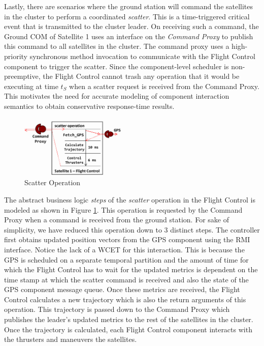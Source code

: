 Lastly, there are scenarios where the ground station will command the satellites in the cluster to perform a coordinated \emph{scatter}. This is a time-triggered critical event that is transmitted to the cluster leader. On receiving such a command, the Ground COM of Satellite 1 uses an interface on the \emph{Command Proxy} to publish this command to all satellites in the cluster. The command proxy uses a high-priority synchronous method invocation to communicate with the Flight Control component to trigger the scatter. Since the component-level scheduler is non-preemptive, the Flight Control cannot trash any operation that it would be executing at time $t_S$ when a scatter request is received from the Command Proxy. This motivates the need for accurate modeling of component interaction semantics to obtain conservative response-time results. 

\begin{figure}[htb]
	\centering
	\includegraphics[width=0.45\textwidth]{figs/scatter.jpg}
	\caption{Scatter Operation}
	\label{fig:FLC}
\end{figure}

The abstract business logic \emph{steps} of the \emph{scatter} operation in the Flight Control is modeled as shown in Figure \ref{fig:FLC}. This operation is requested by the Command Proxy when a command is received from the ground station. For sake of simplicity, we have reduced this operation down to 3 distinct steps. The controller first obtains updated position vectors from the GPS component using the RMI interface. Notice the lack of a WCET for this interaction. This is because the GPS is scheduled on a separate temporal partition and the amount of time for which the Flight Control has to wait for the updated metrics is dependent on the time stamp at which the scatter command is received and also the state of the GPS component message queue. Once these metrics are received, the Flight Control calculates a new trajectory which is also the return arguments of this operation. This trajectory is passed down to the Command Proxy which publishes the leader's updated metrics to the rest of the satellites in the cluster. Once the trajectory is calculated, each Flight Control component interacts with the thrusters and maneuvers the satellites.  

